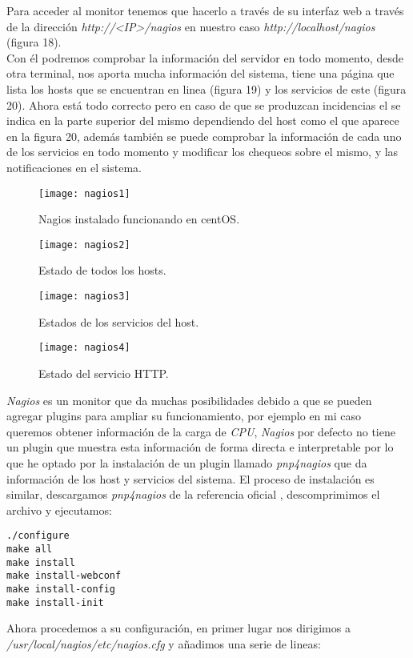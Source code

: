 \documentclass[a4paper, 10pt]{article} %
\begin{document}
Para acceder al monitor tenemos que hacerlo a través de su interfaz web a través de la dirección \textit{http://<IP>/nagios} en nuestro caso \textit{http://localhost/nagios} (figura 18).\\
Con él podremos comprobar la información del servidor en todo momento, desde otra terminal, nos aporta mucha información del sistema, tiene una página que lista los hosts que se encuentran en linea (figura 19) y los servicios de este (figura 20). Ahora está todo correcto pero en caso de que se produzcan incidencias el se indica en la parte superior del mismo dependiendo del host como el que aparece en la figura 20, además también se puede comprobar la información de cada uno de los servicios en todo momento y modificar los chequeos sobre el mismo, y las notificaciones en el sistema.
\begin{figure}[H]
\centering 
\texttt{[image: nagios1]} 
\caption{Nagios instalado funcionando en centOS.} 
\label{contexto:figura} 
\end{figure}
 \begin{figure}[H]
\centering 
\texttt{[image: nagios2]} 
\caption{Estado de todos los hosts.} 
\label{contexto:figura} 
\end{figure}
\begin{figure}[H]
\centering 
\texttt{[image: nagios3]} 
\caption{Estados de los servicios del host.} 
\label{contexto:figura} 
\end{figure}
\begin{figure}[H]
\centering 
\texttt{[image: nagios4]} 
\caption{Estado del servicio HTTP.} 
\label{contexto:figura} 
\end{figure}
\textit{Nagios} es un monitor que da muchas posibilidades debido a que se pueden agregar plugins para ampliar su funcionamiento, por ejemplo en mi caso queremos obtener información de la carga de \textit{CPU}, \textit{Nagios} por defecto no tiene un plugin que muestra esta información de forma directa e interpretable por lo que he optado por la instalación de un plugin llamado \textit{pnp4nagios} que da información de los host y servicios del sistema. El proceso de instalación es similar, descargamos \textit{pnp4nagios} de la referencia oficial \cite{9}, descomprimimos el archivo y ejecutamos:
\begin{verbatim}
./configure
make all
make install
make install-webconf
make install-config
make install-init
\end{verbatim}
Ahora procedemos a su configuración, en primer lugar nos dirigimos a \textit{/usr/local/nagios/etc/nagios.cfg} y añadimos una serie de lineas:
\end{document}

